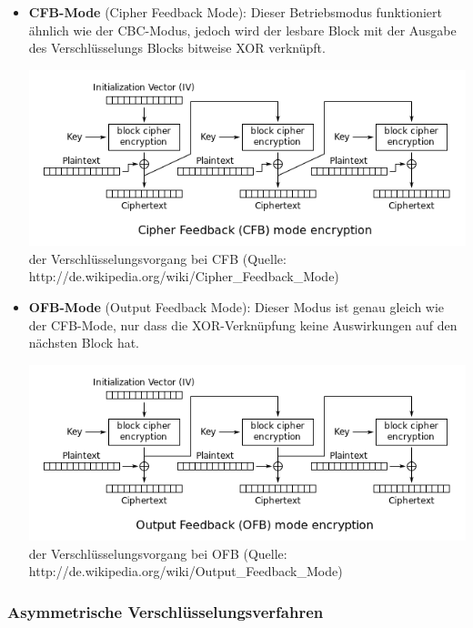 \documentclass[12pt,a4paper]{report}
\begin{document}
\begin{onehalfspace}
\begin{itemize}
\item \textbf{CFB-Mode} (Cipher Feedback Mode): Dieser Betriebsmodus funktioniert ähnlich wie der CBC-Modus, jedoch wird der lesbare Block mit der Ausgabe des Verschlüsselungs Blocks bitweise XOR verknüpft.

\begin{center}
\includegraphics[scale=0.7]{img/cfb.png}\\
der Verschlüsselungsvorgang bei CFB (Quelle: http://de.wikipedia.org/wiki/Cipher\_Feedback\_Mode)
\end{center}

\item \textbf{OFB-Mode} (Output Feedback Mode): Dieser Modus ist genau gleich wie der CFB-Mode, nur dass die XOR-Verknüpfung keine Auswirkungen auf den nächsten Block hat.

\begin{center}
\includegraphics[scale=0.7]{img/ofb.png}\\
der Verschlüsselungsvorgang bei OFB (Quelle: http://de.wikipedia.org/wiki/Output\_Feedback\_Mode)
\end{center}

\end{itemize}

\subsubsection{Asymmetrische Verschlüsselungsverfahren}


\end{onehalfspace}
\end{document}
